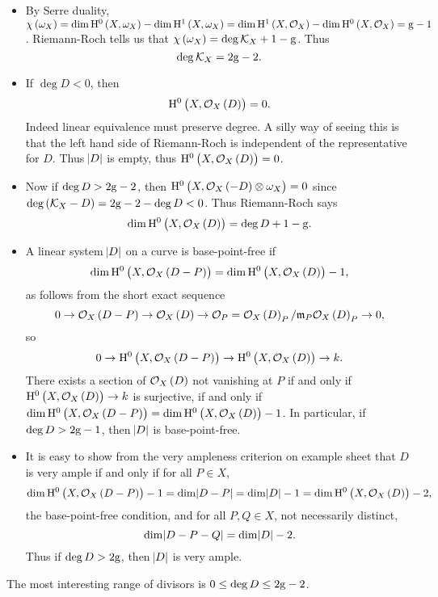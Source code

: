 \begin{remark*}
\hfill
\begin{itemize}
\item By Serre duality, $ \chi\br{\omega_X} = \dim \H^0\br{X, \omega_X} - \dim \H^1\br{X, \omega_X} = \dim \H^1\br{X, \OOO_X} - \dim \H^0\br{X, \OOO_X} = \g - 1 $. Riemann-Roch tells us that $ \chi\br{\omega_X} = \deg \KKK_X + 1 - \g $. Thus
$$ \deg \mathcal{K}_X = 2\mathrm{g} - 2. $$
\item If $ \deg D < 0 $, then
$$ \H^0\br{X, \OOO_X\br{D}} = 0. $$
Indeed linear equivalence must preserve degree. A silly way of seeing this is that the left hand side of Riemann-Roch is independent of the representative for $ D $. Thus $ \abs{D} $ is empty, thus $ \H^0\br{X, \OOO_X\br{D}} = 0 $.
\item Now if $ \deg D > 2\mathrm{g} - 2 $, then $ \H^0\br{X, \OOO_X\br{-D} \otimes \omega_X} = 0 $ since $ \deg \br{\KKK_X - D} = 2\g - 2 - \deg D < 0 $. Thus Riemann-Roch says
$$ \dim \H^0\br{X, \OOO_X\br{D}} = \deg D + 1 - \g. $$
\item A linear system $ \abs{D} $ on a curve is base-point-free if
$$ \dim \H^0\br{X, \OOO_X\br{D - P}} = \dim \H^0\br{X, \OOO_X\br{D}} - 1, $$
as follows from the short exact sequence
$$ 0 \to \OOO_X\br{D - P} \to \OOO_X\br{D} \to \OOO_P = \OOO_X\br{D}_P / \mmm_P\OOO_X\br{D}_P \to 0, $$
so
$$ 0 \to \H^0\br{X, \OOO_X\br{D - P}} \to \H^0\br{X, \OOO_X\br{D}} \to k. $$
There exists a section of $ \OOO_X\br{D} $ not vanishing at $ P $ if and only if $ \H^0\br{X, \OOO_X\br{D}} \to k $ is surjective, if and only if $ \dim \H^0\br{X, \OOO_X\br{D - P}} = \dim \H^0\br{X, \OOO_X\br{D}} - 1 $. In particular, if $ \deg D > 2\mathrm{g} - 1 $, then $ \abs{D} $ is base-point-free.

\pagebreak

\item It is easy to show from the very ampleness criterion on example sheet that $ D $ is very ample if and only if for all $ P \in X $,
$$ \dim \H^0\br{X, \OOO_X\br{D - P}} - 1 = \dim \abs{D - P} = \dim \abs{D} - 1 = \dim \H^0\br{X, \OOO_X\br{D}} - 2, $$
the base-point-free condition, and for all $ P, Q \in X $, not necessarily distinct,
$$ \dim \abs{D - P - Q} = \dim \abs{D} - 2. $$
Thus if $ \deg D > 2\mathrm{g} $, then $ \abs{D} $ is very ample.
\end{itemize}
\end{remark*}

The most interesting range of divisors is $ 0 \le \deg D \le 2\mathrm{g} - 2 $.

